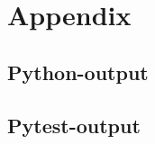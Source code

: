 \documentclass{article}
\begin{document}
	
		\section{Appendix}
			\subsection{Python-output}\label{lst:python-output}
			\subsection{Pytest-output}
\end{document}
